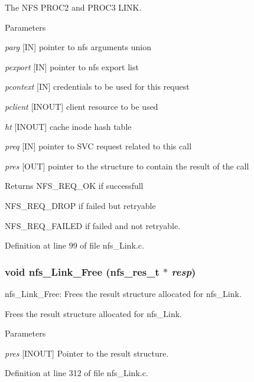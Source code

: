 The NFS PROC2 and PROC3 LINK.


\begin{DoxyParams}{Parameters}
\item[{\em parg}][IN] pointer to nfs arguments union \item[{\em pexport}][IN] pointer to nfs export list \item[{\em pcontext}][IN] credentials to be used for this request \item[{\em pclient}][INOUT] client resource to be used \item[{\em ht}][INOUT] cache inode hash table \item[{\em preq}][IN] pointer to SVC request related to this call \item[{\em pres}][OUT] pointer to the structure to contain the result of the call\end{DoxyParams}
\begin{DoxyReturn}{Returns}
NFS\_\-REQ\_\-OK if successfull \par
 NFS\_\-REQ\_\-DROP if failed but retryable \par
 NFS\_\-REQ\_\-FAILED if failed and not retryable. 
\end{DoxyReturn}


Definition at line 99 of file nfs\_\-Link.c.
\subsubsection[{nfs\_\-Link\_\-Free}]{\setlength{\rightskip}{0pt plus 5cm}void nfs\_\-Link\_\-Free (nfs\_\-res\_\-t $\ast$ {\em resp})}\label{nfs__Link_8c_a6c80f148619689895f7abf0ba965d5d2}
nfs\_\-Link\_\-Free: Frees the result structure allocated for nfs\_\-Link.

Frees the result structure allocated for nfs\_\-Link.


\begin{DoxyParams}{Parameters}
\item[{\em pres}][INOUT] Pointer to the result structure. \end{DoxyParams}


Definition at line 312 of file nfs\_\-Link.c.